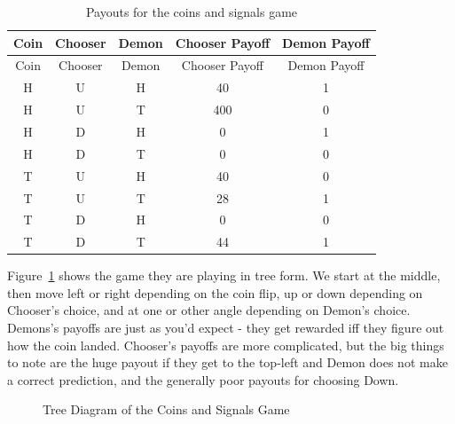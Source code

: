 \documentclass[
  12pt,
  letterpaper,
  DIV=11,
  numbers=noendperiod]{scrreprt}
\begin{document}
\begin{longtable}[]{@{}ccccc@{}}
\caption{Payouts for the coins and signals
game}\label{tbl-payoffs-demon-coin}\tabularnewline
\toprule\noalign{}
Coin & Chooser & Demon & Chooser Payoff & Demon Payoff \\
\midrule\noalign{}
\endfirsthead
\toprule\noalign{}
Coin & Chooser & Demon & Chooser Payoff & Demon Payoff \\
\midrule\noalign{}
\endhead
\bottomrule\noalign{}
\endlastfoot
H & U & H & 40 & 1 \\
H & U & T & 400 & 0 \\
H & D & H & 0 & 1 \\
H & D & T & 0 & 0 \\
T & U & H & 40 & 0 \\
T & U & T & 28 & 1 \\
T & D & H & 0 & 0 \\
T & D & T & 44 & 1 \\
\end{longtable}

Figure~\ref{fig-second-anti-war} shows the game they are playing in tree
form. We start at the middle, then move left or right depending on the
coin flip, up or down depending on Chooser's choice, and at one or other
angle depending on Demon's choice. Demons's payoffs are just as you'd
expect - they get rewarded iff they figure out how the coin landed.
Chooser's payoffs are more complicated, but the big things to note are
the huge payout if they get to the top-left and Demon does not make a
correct prediction, and the generally poor payouts for choosing Down.

\begin{figure}


\caption{\label{fig-second-anti-war}Tree Diagram of the Coins and
Signals Game}

\end{figure}%
\end{document}
